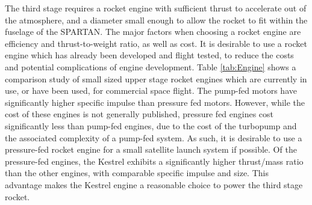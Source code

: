 The third stage requires a rocket engine with sufficient thrust to accelerate out of the atmosphere, and a diameter small enough to allow the rocket to fit within the fuselage of the SPARTAN. The major factors when choosing a rocket engine are efficiency and thrust-to-weight ratio, as well as cost. It is desirable to use a rocket engine which has already been developed and flight tested, to reduce the costs and potential complications of engine development. Table \ref{tab:Engine} shows a comparison study of small sized upper stage rocket engines which are currently in use, or have been used, for commercial space flight. The pump-fed motors have significantly higher specific impulse than pressure fed motors. However, while the cost of these engines is not generally published, pressure fed engines cost significantly less than pump-fed engines, due to the cost of the turbopump and the associated complexity of a pump-fed system. As such, it is desirable to use a pressure-fed rocket engine for a small satellite launch system if possible. Of the pressure-fed engines, the Kestrel exhibits a significantly higher thrust/mass ratio than the other engines, with comparable specific impulse and size. This advantage makes the Kestrel engine a reasonable choice to power the third stage rocket.  


